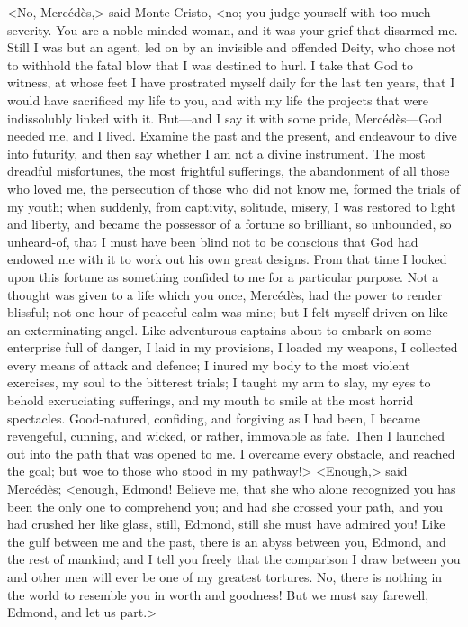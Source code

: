  <No, Mercédès,> said Monte Cristo, <no; you judge yourself with too much severity. You are a noble-minded woman, and it was your grief that disarmed me. Still I was but an agent, led on by an invisible and offended Deity, who chose not to withhold the fatal blow that I was destined to hurl. I take that God to witness, at whose feet I have prostrated myself daily for the last ten years, that I would have sacrificed my life to you, and with my life the projects that were indissolubly linked with it. But—and I say it with some pride, Mercédès—God needed me, and I lived. Examine the past and the present, and endeavour to dive into futurity, and then say whether I am not a divine instrument. The most dreadful misfortunes, the most frightful sufferings, the abandonment of all those who loved me, the persecution of those who did not know me, formed the trials of my youth; when suddenly, from captivity, solitude, misery, I was restored to light and liberty, and became the possessor of a fortune so brilliant, so unbounded, so unheard-of, that I must have been blind not to be conscious that God had endowed me with it to work out his own great designs. From that time I looked upon this fortune as something confided to me for a particular purpose. Not a thought was given to a life which you once, Mercédès, had the power to render blissful; not one hour of peaceful calm was mine; but I felt myself driven on like an exterminating angel. Like adventurous captains about to embark on some enterprise full of danger, I laid in my provisions, I loaded my weapons, I collected every means of attack and defence; I inured my body to the most violent exercises, my soul to the bitterest trials; I taught my arm to slay, my eyes to behold excruciating sufferings, and my mouth to smile at the most horrid spectacles. Good-natured, confiding, and forgiving as I had been, I became revengeful, cunning, and wicked, or rather, immovable as fate. Then I launched out into the path that was opened to me. I overcame every obstacle, and reached the goal; but woe to those who stood in my pathway!>  <Enough,> said Mercédès; <enough, Edmond! Believe me, that she who alone recognized you has been the only one to comprehend you; and had she crossed your path, and you had crushed her like glass, still, Edmond, still she must have admired you! Like the gulf between me and the past, there is an abyss between you, Edmond, and the rest of mankind; and I tell you freely that the comparison I draw between you and other men will ever be one of my greatest tortures. No, there is nothing in the world to resemble you in worth and goodness! But we must say farewell, Edmond, and let us part.> 

